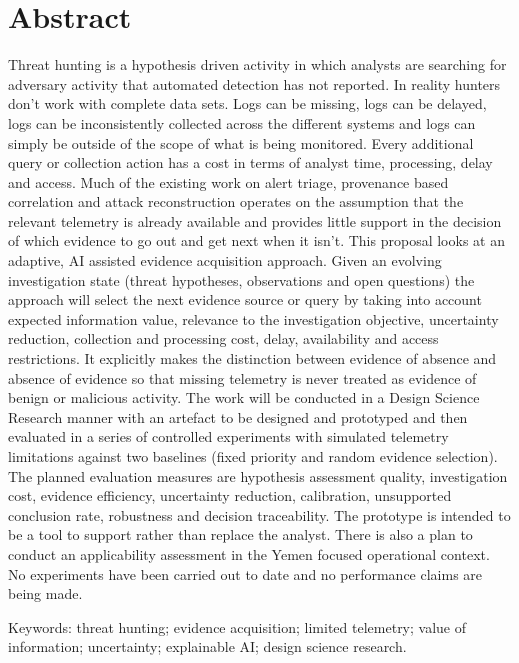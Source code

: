 \documentclass[a4paper,11pt]{article}
\begin{document}
\section*{Abstract}
Threat hunting is a hypothesis driven activity in which analysts are searching for adversary activity that automated detection has not reported. In reality hunters don't work with complete data sets. Logs can be missing, logs can be delayed, logs can be inconsistently collected across the different systems and logs can simply be outside of the scope of what is being monitored. Every additional query or collection action has a cost in terms of analyst time, processing, delay and access. Much of the existing work on alert triage, provenance based correlation and attack reconstruction operates on the assumption that the relevant telemetry is already available and provides little support in the decision of which evidence to go out and get next when it isn't. This proposal looks at an adaptive, AI assisted evidence acquisition approach. Given an evolving investigation state (threat hypotheses, observations and open questions) the approach will select the next evidence source or query by taking into account expected information value, relevance to the investigation objective, uncertainty reduction, collection and processing cost, delay, availability and access restrictions. It explicitly makes the distinction between evidence of absence and absence of evidence so that missing telemetry is never treated as evidence of benign or malicious activity. The work will be conducted in a Design Science Research manner with an artefact to be designed and prototyped and then evaluated in a series of controlled experiments with simulated telemetry limitations against two baselines (fixed priority and random evidence selection). The planned evaluation measures are hypothesis assessment quality, investigation cost, evidence efficiency, uncertainty reduction, calibration, unsupported conclusion rate, robustness and decision traceability. The prototype is intended to be a tool to support rather than replace the analyst. There is also a plan to conduct an applicability assessment in the Yemen focused operational context. No experiments have been carried out to date and no performance claims are being made.
\par
Keywords: threat hunting; evidence acquisition; limited telemetry; value of information; uncertainty; explainable AI; design science research.
\newpage
\tableofcontents
\clearpage
\end{document}
